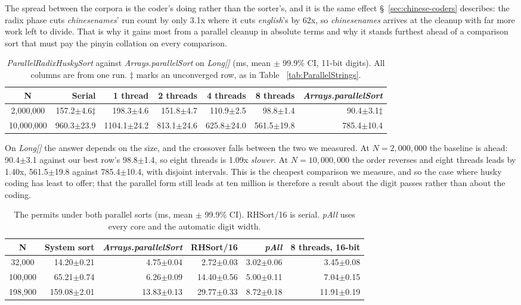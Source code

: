 \documentclass[twoside,leqno,twocolumn]{article}
\begin{document}
The spread between the corpora is the coder's doing rather than the sorter's, and it is the same
effect \S~\ref{sec:chinese-coders} describes: the radix phase cuts \textit{chinesenames}' run count by
only 3.1x where it cuts \textit{english}'s by 62x, so \textit{chinesenames} arrives at the cleanup with
far more work left to divide.
That is why it gains most from a parallel cleanup in absolute terms and why it stands furthest ahead of
a comparison sort that must pay the pinyin collation on every comparison.

\begin{table}
  \caption{\textit{ParallelRadixHuskySort} against \mbox{\textit{Arrays.parallelSort}} on
    \textit{Long[]} (ms, mean $\pm$ 99.9\% CI, 11-bit digits). All columns are from one run.
    $\ddagger$ marks an unconverged row, as in Table ~\ref{tab:ParallelStrings}.}
  \label{tab:ParallelBaseline}
  \centering
  \begin{tabular}{crrrrrr}
    \toprule
    N & Serial & 1 thread & 2 threads & 4 threads & 8 threads & \textit{Arrays.parallelSort} \\
    \midrule
    2,000,000 & 157.2$\pm$4.6$\ddagger$ & 198.3$\pm$4.6 & 151.8$\pm$4.7 & 110.9$\pm$2.5 & 98.8$\pm$1.4 & 90.4$\pm$3.1$\ddagger$ \\
    10,000,000 & 960.3$\pm$23.9 & 1104.1$\pm$24.2 & 813.1$\pm$24.6 & 625.8$\pm$24.0 & 561.5$\pm$19.8 & 785.4$\pm$10.4 \\
    \bottomrule
  \end{tabular}
\end{table}

On \textit{Long[]} the answer depends on the size, and the crossover falls between the two we measured.
At $N=2{,}000{,}000$ the baseline is ahead: 90.4$\pm$3.1 against our best row's 98.8$\pm$1.4, so eight
threads is 1.09x \emph{slower}.
At $N=10{,}000{,}000$ the order reverses and eight threads leads by 1.40x, 561.5$\pm$19.8 against
785.4$\pm$10.4, with disjoint intervals.
This is the cheapest comparison we measure, and so the case where husky coding has least to offer; that
the parallel form still leads at ten million is therefore a result about the digit passes rather than
about the coding.

\begin{table}
  \caption{The permits under both parallel sorts (ms, mean $\pm$ 99.9\% CI). RHSort/16 is serial.
    \textit{pAll} uses every core and the automatic digit width.}
  \label{tab:ParallelPermits}
  \centering
  \begin{tabular}{crrrrr}
    \toprule
    N & System sort & \textit{Arrays.parallelSort} & RHSort/16 & \textit{pAll} & 8 threads, 16-bit \\
    \midrule
    32,000 & 14.20$\pm$0.21 & 4.75$\pm$0.04 & 2.72$\pm$0.03 & 3.02$\pm$0.06 & 3.45$\pm$0.08 \\
    100,000 & 65.21$\pm$0.74 & 6.26$\pm$0.09 & 14.40$\pm$0.56 & 5.00$\pm$0.11 & 7.04$\pm$0.15 \\
    198,900 & 159.08$\pm$2.01 & 13.83$\pm$0.13 & 29.77$\pm$0.33 & 8.72$\pm$0.18 & 11.91$\pm$0.19 \\
    \bottomrule
  \end{tabular}
\end{table}
\end{document}

